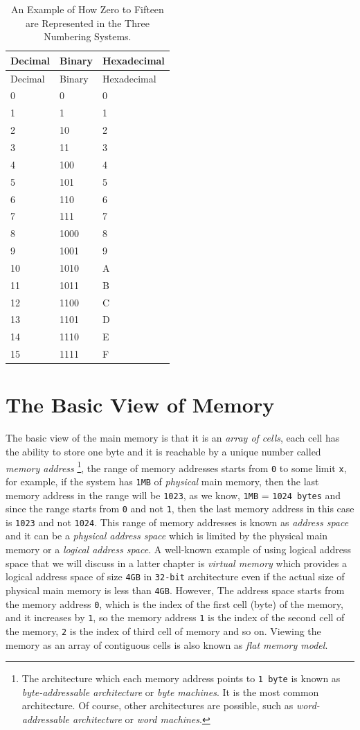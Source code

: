 \begin{longtable}[]{@{}lll@{}}
\caption{An Example of How Zero to Fifteen are Represented in the Three
Numbering Systems.}\tabularnewline
\toprule
Decimal & Binary & Hexadecimal\tabularnewline
\midrule
\endfirsthead
\toprule
Decimal & Binary & Hexadecimal\tabularnewline
\midrule
\endhead
0 & 0 & 0\tabularnewline
1 & 1 & 1\tabularnewline
2 & 10 & 2\tabularnewline
3 & 11 & 3\tabularnewline
4 & 100 & 4\tabularnewline
5 & 101 & 5\tabularnewline
6 & 110 & 6\tabularnewline
7 & 111 & 7\tabularnewline
8 & 1000 & 8\tabularnewline
9 & 1001 & 9\tabularnewline
10 & 1010 & A\tabularnewline
11 & 1011 & B\tabularnewline
12 & 1100 & C\tabularnewline
13 & 1101 & D\tabularnewline
14 & 1110 & E\tabularnewline
15 & 1111 & F\tabularnewline
\bottomrule
\end{longtable}

\section{The Basic View of Memory}\label{the-basic-view-of-memory}

The basic view of the main memory is that it is an \emph{array of
cells}, each cell has the ability to store one byte and it is reachable
by a unique number called \emph{memory address} \footnote{The
  architecture which each memory address points to \lstinline!1 byte! is
  known as \emph{byte-addressable architecture} or \emph{byte machines}.
  It is the most common architecture. Of course, other architectures are
  possible, such as \emph{word-addressable architecture} or \emph{word
  machines}.}, the range of memory addresses starts from \lstinline!0!
to some limit \lstinline!x!, for example, if the system has
\lstinline!1MB! of \emph{physical} main memory, then the last memory
address in the range will be \lstinline!1023!, as we know,
\lstinline!1MB! = \lstinline!1024 bytes! and since the range starts from
\lstinline!0! and not \lstinline!1!, then the last memory address in
this case is \lstinline!1023! and not \lstinline!1024!. This range of
memory addresses is known as \emph{address space} and it can be a
\emph{physical address space} which is limited by the physical main
memory or a \emph{logical address space}. A well-known example of using
logical address space that we will discuss in a latter chapter is
\emph{virtual memory} which provides a logical address space of size
\lstinline!4GB! in \lstinline!32-bit! architecture even if the actual
size of physical main memory is less than \lstinline!4GB!. However, The
address space starts from the memory address \lstinline!0!, which is the
index of the first cell (byte) of the memory, and it increases by
\lstinline!1!, so the memory address \lstinline!1! is the index of the
second cell of the memory, \lstinline!2! is the index of third cell of
memory and so on. Viewing the memory as an array of contiguous cells is
also known as \emph{flat memory model}.


